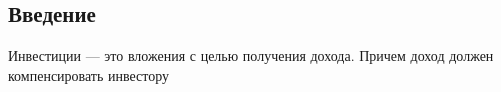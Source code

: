 \subsection*{Введение}

 Инвестиции --- это вложения с целью получения дохода. Причем доход должен компенсировать инвестору










